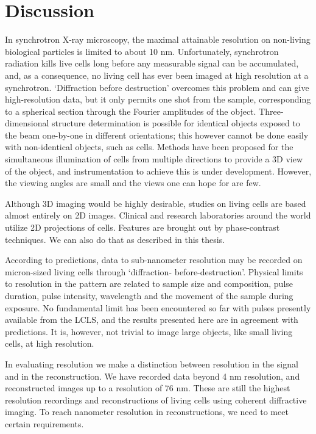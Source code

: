 \chapter{Discussion}

In synchrotron X-ray microscopy, the maximal attainable resolution on non-living biological particles is limited to about 10 nm. Unfortunately, synchrotron radiation kills live cells long before any measurable signal can be accumulated, and, as a consequence, no living cell has ever been imaged at high resolution at a synchrotron. ‘Diffraction before destruction’ overcomes this problem and can give high-resolution data, but it only permits one shot from the sample, corresponding to a spherical section through the Fourier amplitudes of the object. Three-dimensional structure determination is possible for identical objects exposed to the beam one-by-one in different orientations; this however cannot be done easily with non-identical objects, such as cells. Methods have been proposed for the simultaneous illumination of cells from multiple directions to provide a 3D view of the object, and instrumentation to achieve this is under development. However, the viewing angles are small and the views one can hope for are few. 

Although 3D imaging would be highly desirable, studies on living cells are based almost entirely on 2D images. Clinical and research laboratories around the world utilize 2D projections of cells. Features are brought out by phase-contrast techniques. We can also do that as described in this thesis.
 
According to predictions, data to sub-nanometer resolution may be recorded on micron-sized living cells through ‘diffraction- before-destruction’. Physical limits to resolution in the pattern are related to sample size and composition, pulse duration, pulse intensity, wavelength and the movement of the sample during exposure. No fundamental limit has been encountered so far with pulses presently available from the LCLS, and the results presented here are in agreement with predictions. It is, however, not trivial to image large objects, like small living cells, at high resolution.

In evaluating resolution we make a distinction between resolution in the signal and in the reconstruction. We have recorded data beyond 4 nm resolution, and reconstructed images up to a resolution of 76 nm. These are still the highest resolution recordings and reconstructions of living cells using coherent diffractive imaging. To reach nanometer resolution in reconstructions, we need to meet certain requirements.

